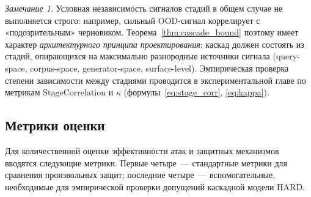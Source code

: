 \documentclass[12pt, a4paper]{article}
\theoremstyle{definition}
\theoremstyle{remark}
\newtheorem*{remark}{Замечание}
\begin{document}
\begin{remark}
Условная независимость сигналов стадий в общем случае не выполняется строго: например, сильный OOD-сигнал коррелирует с «подозрительным» черновиком. Теорема~\ref{thm:cascade_bound} поэтому имеет характер \textit{архитектурного принципа проектирования}: каскад должен состоять из стадий, опирающихся на максимально разнородные источники сигнала (query-space, corpus-space, generator-space, surface-level). Эмпирическая проверка степени зависимости между стадиями проводится в экспериментальной главе по метрикам $\mathrm{StageCorrelation}$ и $\kappa$ (формулы~\eqref{eq:stage_corr}, \eqref{eq:kappa}).
\end{remark}

\subsection{Метрики оценки}
\label{sec:metrics}

Для количественной оценки эффективности атак и защитных механизмов вводятся следующие метрики. Первые четыре~--- стандартные метрики для сравнения произвольных защит; последние четыре~--- вспомогательные, необходимые для эмпирической проверки допущений каскадной модели HARD.
\end{document}
